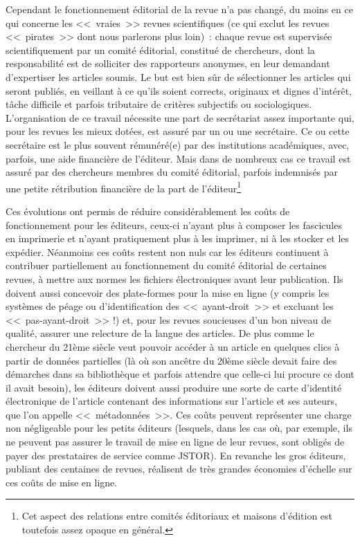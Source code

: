Cependant le fonctionnement {\'e}ditorial de la revue n'a pas chang{\'e}, du moins en ce qui concerne les <<~vraies~>> revues scientifiques (ce qui
exclut les revues <<~pirates~>> dont nous parlerons plus loin)~: chaque revue est supervis{\'e}e scientifiquement par un comit{\'e} {\'e}ditorial, constitu{\'e}
de chercheurs, dont la responsabilit{\'e} est de solliciter des rapporteurs anonymes, en leur demandant d'expertiser les articles soumis. Le but
est bien s{\^u}r de s{\'e}lectionner les articles qui seront publi{\'e}s, en veillant {\`a} ce qu'ils soient corrects, originaux et dignes d'int{\'e}r{\^e}t,
t{\^a}che difficile et parfois tributaire de crit{\`e}res subjectifs ou sociologiques. L'organisation de ce travail n{\'e}cessite une part de secr{\'e}tariat
assez importante qui, pour les revues les mieux dot{\'e}es, est assur{\'e} par un ou une secr{\'e}taire. Ce ou cette secr{\'e}taire est le plus souvent r{\'e}mun{\'e}r{\'e}(e)
par des institutions acad{\'e}miques, avec, parfois, une aide financi{\`e}re de l'{\'e}diteur. Mais dans de nombreux cas ce travail est assur{\'e} par des chercheurs
membres du comit{\'e} {\'e}ditorial, parfois indemnis{\'e}s par une petite r{\'e}tribution financi{\`e}re de la part de l'{\'e}diteur\footnote{Cet aspect
 des relations entre comit{\'e}s {\'e}ditoriaux et maisons d'{\'e}dition est toutefois assez opaque en g{\'e}n{\'e}ral.}

Ces {\'e}volutions ont permis de r{\'e}duire consid{\'e}rablement les co{\^u}ts de fonctionnement pour les {\'e}diteurs, ceux-ci n'ayant plus {\`a} composer les fascicules
en imprimerie et n'ayant pratiquement plus {\`a} les imprimer, ni {\`a} les stocker et les exp{\'e}dier. N{\'e}anmoins ces co{\^u}ts restent non nuls car les {\'e}diteurs
continuent {\`a} contribuer partiellement au fonctionnement du comit{\'e} {\'e}ditorial de certaines revues, {\`a} mettre aux normes les fichiers {\'e}lectroniques
avant leur publication. Ils doivent aussi concevoir des plate-formes pour la mise en ligne (y compris les syst{\`e}mes de p{\'e}age ou d'identification
des <<~ayant-droit~>> et excluant les <<~pas-ayant-droit~>> !)
et, pour les revues soucieuses d'un bon niveau de qualit{\'e}, assurer une relecture de la langue des articles. De plus comme
le chercheur du 21{\`e}me si{\`e}cle veut pouvoir acc{\'e}der {\`a} un article en quelques clics {\`a} partir de donn{\'e}es partielles (l{\`a} o{\`u} son anc{\^e}tre du 20{\`e}me si{\`e}cle
devait faire des d{\'e}marches dans sa biblioth{\`e}que et parfois attendre que celle-ci lui procure ce dont il avait besoin), les {\'e}diteurs doivent aussi
produire une sorte de carte d'identit{\'e} {\'e}lectronique de l'article contenant des informations sur l'article et ses auteurs, que l'on appelle <<~m{\'e}tadonn{\'e}es~>>.
Ces co{\^u}ts peuvent repr{\'e}senter une charge non n{\'e}gligeable pour les petits {\'e}diteurs (lesquels, dans les cas o{\`u}, par exemple, ils ne peuvent pas assurer
le travail de mise en ligne de leur revues, sont oblig{\'e}s de payer des prestataires de service comme JSTOR). En revanche les gros {\'e}diteurs, publiant des
centaines de revues, r{\'e}alisent de tr{\`e}s grandes {\'e}conomies d'{\'e}chelle sur ces co{\^u}ts de mise en ligne. 

